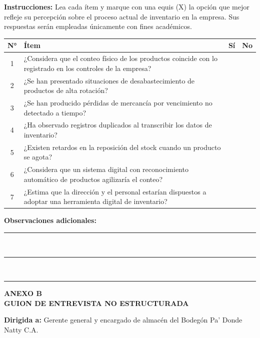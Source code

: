 \documentclass[12pt, letterpaper]{report}
\begin{document}
\textbf{Instrucciones:} Lea cada ítem y marque con una equis (X) la
opción que mejor refleje su percepción sobre el proceso actual de
inventario en la empresa. Sus respuestas serán empleadas únicamente
con fines académicos.

\vspace{8pt}

\noindent
\begin{tabular}{|c|p{8.5cm}|c|c|}
\hline
\textbf{N°} & \textbf{Ítem} & \textbf{Sí} & \textbf{No} \\
\hline
1 & ¿Considera que el conteo físico de los productos coincide con lo registrado en los controles de la empresa? & & \\
\hline
2 & ¿Se han presentado situaciones de desabastecimiento de productos de alta rotación? & & \\
\hline
3 & ¿Se han producido pérdidas de mercancía por vencimiento no detectado a tiempo? & & \\
\hline
4 & ¿Ha observado registros duplicados al transcribir los datos de inventario? & & \\
\hline
5 & ¿Existen retardos en la reposición del stock cuando un producto se agota? & & \\
\hline
6 & ¿Considera que un sistema digital con reconocimiento automático de productos agilizaría el conteo? & & \\
\hline
7 & ¿Estima que la dirección y el personal estarían dispuestos a adoptar una herramienta digital de inventario? & & \\
\hline
\end{tabular}

\vspace{12pt}
\noindent\textbf{Observaciones adicionales:}\par
\noindent\rule{\textwidth}{0.4pt}\\[4pt]
\noindent\rule{\textwidth}{0.4pt}\\[4pt]
\noindent\rule{\textwidth}{0.4pt}

\clearpage
\begin{center}
{\fontsize{14}{16}\selectfont\bfseries
ANEXO B\\
GUION DE ENTREVISTA NO ESTRUCTURADA\par}
\end{center}
\vspace{12pt}

\textbf{Dirigida a:} Gerente general y encargado de almacén del
Bodegón Pa' Donde Natty C.A.
\end{document}
